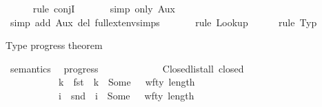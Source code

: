 \begin{isabellebody}
\ \ \ \ \isamarkupfalse%
\ {\isacharparenleft}{\kern0pt}rule\ conjI{\isacharparenright}{\kern0pt}\isanewline
\ \ \ \ \ \isamarkupfalse%
\ {\isacharparenleft}{\kern0pt}simp\ only{\isacharcolon}{\kern0pt}\ Aux{}{\isacharparenright}{\kern0pt}\isanewline
\ \ \ \ \ \isamarkupfalse%
\ {\isacharparenleft}{\kern0pt}simp\ add{\isacharcolon}{\kern0pt}\ Aux{}\ del{\isacharcolon}{\kern0pt}\ full{\isacharunderscore}{\kern0pt}ext{\isacharunderscore}{\kern0pt}env{\isachardot}{\kern0pt}simps{\isacharparenright}{\kern0pt}\isanewline
\ \ \ \ \ \isamarkupfalse%
\ {\isacharparenleft}{\kern0pt}rule\ Lookup{\isacharparenright}{\kern0pt}\isanewline
\ \ \ \ \isamarkupfalse%
\ {\isacharparenleft}{\kern0pt}rule\ Typ{\isacharparenright}{\kern0pt}\isanewline
\ \ \ \ \isamarkupfalse%
\isanewline
{}\isamarkupfalse%
%
\endisatagproof
{\isafoldproof}%
%
\isadelimproof
%
\endisadelimproof
%
\begin{isamarkuptext}%
Type progress theorem%
\end{isamarkuptext}\isamarkuptrue%
\isamarkupfalse%
\ semantics\ \isanewline
\isanewline
{}\isamarkupfalse%
\ progress{\isacharcolon}{\kern0pt}\isanewline
\ \ \isanewline
\ \ \ \ \ \ \ \ \ \ Closed{\isacharunderscore}{\kern0pt}{\isasymOmega}{\isacharcolon}{\kern0pt}{\isachardoublequoteopen}list{\isacharunderscore}{\kern0pt}all\ closed\ {\isasymOmega}{\isachardoublequoteclose}\ \isanewline
\ \ \ \ \ \ \ \ \ \ {\isachardoublequoteopen}{\isasymforall}\ k\ {\isasymtau}{\isacharprime}{\kern0pt}{\isachardot}{\kern0pt}\ {\isacharparenleft}{\kern0pt}{\isacharparenleft}{\kern0pt}fst\ {\isasymDelta}{\isacharparenright}{\kern0pt}\ k\ {\isacharequal}{\kern0pt}\ Some\ {\isasymtau}{\isacharprime}{\kern0pt}{\isacharparenright}{\kern0pt}\ {\isasymlongrightarrow}\ wf{\isacharunderscore}{\kern0pt}ty\ {\isacharparenleft}{\kern0pt}length\ {\isasymOmega}{\isacharparenright}{\kern0pt}\ {\isasymtau}{\isacharprime}{\kern0pt}{\isachardoublequoteclose}\ \isanewline
\ \ \ \ \ \ \ \ \ \ {\isachardoublequoteopen}{\isasymforall}\ i\ {\isasymtau}{\isacharprime}{\kern0pt}{\isachardot}{\kern0pt}\ {\isacharparenleft}{\kern0pt}{\isacharparenleft}{\kern0pt}snd\ {\isasymDelta}{\isacharparenright}{\kern0pt}\ i\ {\isacharequal}{\kern0pt}\ Some\ {\isasymtau}{\isacharprime}{\kern0pt}{\isacharparenright}{\kern0pt}\ {\isasymlongrightarrow}\ wf{\isacharunderscore}{\kern0pt}ty\ {\isacharparenleft}{\kern0pt}length\ {\isasymOmega}{\isacharparenright}{\kern0pt}\ {\isasymtau}{\isacharprime}{\kern0pt}{\isachardoublequoteclose}\ \isanewline

\end{isabellebody}
